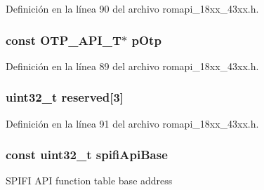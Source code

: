 Definición en la línea 90 del archivo romapi\+\_\+18xx\+\_\+43xx.\+h.

\subsubsection[{\texorpdfstring{p\+Otp}{pOtp}}]{\setlength{\rightskip}{0pt plus 5cm}const {\bf O\+T\+P\+\_\+\+A\+P\+I\+\_\+T}$\ast$ p\+Otp}\hypertarget{struct_l_p_c___r_o_m___a_p_i___t_a86471f8c6688aac6e7445731c93f1e56}{}\label{struct_l_p_c___r_o_m___a_p_i___t_a86471f8c6688aac6e7445731c93f1e56}


Definición en la línea 89 del archivo romapi\+\_\+18xx\+\_\+43xx.\+h.

\subsubsection[{\texorpdfstring{reserved}{reserved}}]{\setlength{\rightskip}{0pt plus 5cm}uint32\+\_\+t reserved\mbox{[}3\mbox{]}}\hypertarget{struct_l_p_c___r_o_m___a_p_i___t_aa6a7e7637e402ba46cf05af64354b460}{}\label{struct_l_p_c___r_o_m___a_p_i___t_aa6a7e7637e402ba46cf05af64354b460}


Definición en la línea 91 del archivo romapi\+\_\+18xx\+\_\+43xx.\+h.

\subsubsection[{\texorpdfstring{spifi\+Api\+Base}{spifiApiBase}}]{\setlength{\rightskip}{0pt plus 5cm}const uint32\+\_\+t spifi\+Api\+Base}\hypertarget{struct_l_p_c___r_o_m___a_p_i___t_a89fd951104ec1dfacddd83e15df96c9b}{}\label{struct_l_p_c___r_o_m___a_p_i___t_a89fd951104ec1dfacddd83e15df96c9b}
S\+P\+I\+FI A\+PI function table base address 

